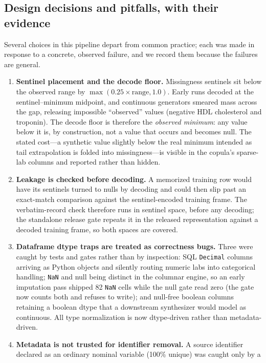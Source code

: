 \documentclass[11pt,a4paper]{article}
\begin{document}
\subsection{Design decisions and pitfalls, with their evidence}
\label{sec:design}

Several choices in this pipeline depart from common practice; each was made in
response to a concrete, observed failure, and we record them because the failures
are general.

\begin{enumerate}
\item \textbf{Sentinel placement and the decode floor.} Missingness sentinels sit
below the observed range by $\max(0.25 \times \text{range}, 1.0)$. Early runs
decoded at the sentinel--minimum midpoint, and continuous generators smeared mass
across the gap, releasing impossible ``observed'' values (negative HDL cholesterol
and troponin). The decode floor is therefore the \emph{observed minimum}: any value
below it is, by construction, not a value that occurs and becomes null. The stated
cost---a synthetic value slightly below the real minimum intended as tail
extrapolation is folded into missingness---is visible in the copula's sparse-lab
columns and reported rather than hidden.
\item \textbf{Leakage is checked before decoding.} A memorized training row would
have its sentinels turned to nulls by decoding and could then slip past an
exact-match comparison against the sentinel-encoded training frame. The
verbatim-record check therefore runs in sentinel space, before any decoding; the
standalone release gate repeats it in the released representation against a decoded
training frame, so both spaces are covered.
\item \textbf{Dataframe dtype traps are treated as correctness bugs.} Three were
caught by tests and gates rather than by inspection: SQL \texttt{Decimal} columns
arriving as Python objects and silently routing numeric labs into categorical
handling; \texttt{NaN} and null being distinct in the columnar engine, so an early
imputation pass shipped 82 \texttt{NaN} cells while the null gate read zero (the
gate now counts both and refuses to write); and null-free boolean columns retaining
a boolean dtype that a downstream synthesizer would model as continuous. All
type normalization is now dtype-driven rather than metadata-driven.
\item \textbf{Metadata is not trusted for identifier removal.} A source identifier
declared as an ordinary nominal variable (100\% unique) was caught only by a

\end{enumerate}
\end{document}
